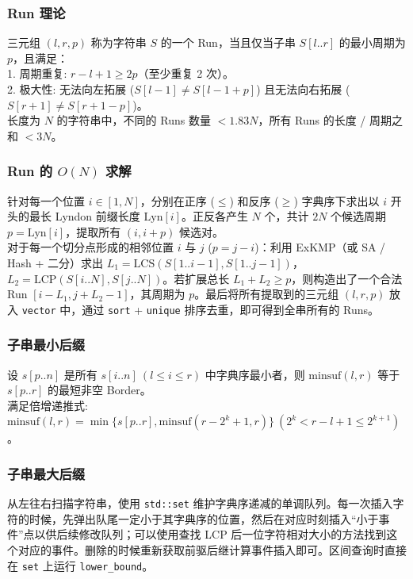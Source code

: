 \subsubsection*{Run 理论}
\noindent
三元组 $(l, r, p)$ 称为字符串 $S$ 的一个 Run，当且仅当子串 $S[l..r]$ 的最小周期为 $p$，且满足：\\
1. 周期重复: $r - l + 1 \ge 2p$（至少重复 2 次）。\\
2. 极大性: 无法向左拓展 ($S[l-1] \neq S[l-1+p]$) 且无法向右拓展 ($S[r+1] \neq S[r+1-p]$)。\\
长度为 $N$ 的字符串中，不同的 Runs 数量 $< 1.83 N$，所有 Runs 的长度 / 周期之和 $< 3N$。

\subsubsection*{Run 的 $O(N)$ 求解}
\noindent
针对每一个位置 $i \in [1, N]$，分别在正序 ($\le$) 和反序 ($\ge$) 字典序下求出以 $i$ 开头的最长 Lyndon 前缀长度 $\text{Lyn}[i]$。正反各产生 $N$ 个，共计 $2N$ 个候选周期 $p = \text{Lyn}[i]$，提取所有 $(i, i+p)$ 候选对。\\
对于每一个切分点形成的相邻位置 $i$ 与 $j$ ($p = j - i$)：利用 ExKMP（或 SA / Hash + 二分）求出 $L_1 = \text{LCS}(S[1..i-1], S[1..j-1])$，$L_2 = \text{LCP}(S[i..N], S[j..N])$。若扩展总长 $L_1 + L_2 \ge p$，则构造出了一个合法 Run $[i - L_1, j + L_2 - 1]$，其周期为 $p$。最后将所有提取到的三元组 $(l, r, p)$ 放入 \texttt{vector} 中，通过 \texttt{sort} + \texttt{unique} 排序去重，即可得到全串所有的 Runs。

\subsubsection*{子串最小后缀}
\noindent
设 $s[p..n]$ 是所有 $s[i..n]\ (l \le i \le r)$ 中字典序最小者，则 $\text{minsuf}(l, r)$ 等于 $s[p..r]$ 的最短非空 Border。\\
满足倍增递推式: $\text{minsuf}(l, r) = \min\{ s[p..r], \text{minsuf}(r - 2^k + 1, r) \}\ (2^k < r - l + 1 \le 2^{k+1})$。

\subsubsection*{子串最大后缀}
\noindent
从左往右扫描字符串，使用 \texttt{std::set} 维护字典序递减的单调队列。每一次插入字符的时候，先弹出队尾一定小于其字典序的位置，然后在对应时刻插入“小于事件”点以供后续修改队列；可以使用查找 LCP 后一位字符相对大小的方法找到这个对应的事件。删除的时候重新获取前驱后继计算事件插入即可。区间查询时直接在 \texttt{set} 上运行 \texttt{lower\_bound}。

